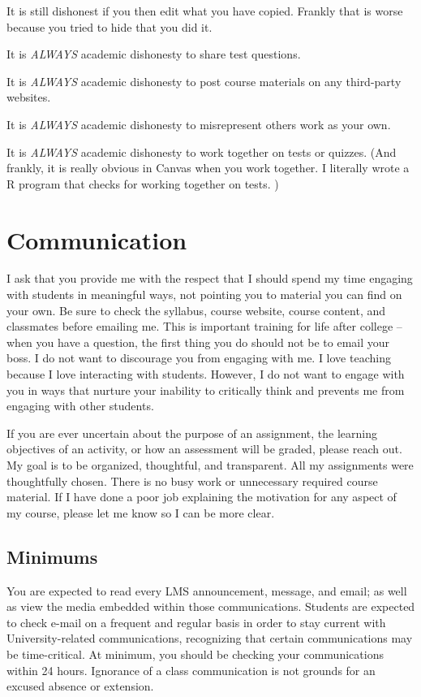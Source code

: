 \documentclass[
]{book}
\begin{document}
It is still dishonest if you then edit what you have copied. Frankly that is worse because you tried to hide that you did it.

It is \emph{ALWAYS} academic dishonesty to share test questions.

It is \emph{ALWAYS} academic dishonesty to post course materials on any third-party websites.

It is \emph{ALWAYS} academic dishonesty to misrepresent others work as your own.

It is \emph{ALWAYS} academic dishonesty to work together on tests or quizzes.
(And frankly, it is really obvious in Canvas when you work together.
I literally wrote a R program that checks for working together on tests. )

\hypertarget{communication}{%
\chapter{Communication}\label{communication}}

I ask that you provide me with the respect that I should spend my time engaging with students in meaningful ways, not pointing you to material you can find on your own. Be sure to check the syllabus, course website, course content, and classmates before emailing me. This is important training for life after college -- when you have a question, the first thing you do should not be to email your boss. I do not want to discourage you from engaging with me. I love teaching because I love interacting with students. However, I do not want to engage with you in ways that nurture your inability to critically think and prevents me from engaging with other students.

If you are ever uncertain about the purpose of an assignment, the learning objectives of an activity, or how an assessment will be graded, please reach out. My goal is to be organized, thoughtful, and transparent. All my assignments were thoughtfully chosen. There is no busy work or unnecessary required course material. If I have done a poor job explaining the motivation for any aspect of my course, please let me know so I can be more clear.

\hypertarget{minimums}{%
\section{Minimums}\label{minimums}}

You are expected to read every LMS announcement, message, and email; as well as view the media embedded within those communications. Students are expected to check e-mail on a frequent and regular basis in order to stay current with University-related communications, recognizing that certain communications may be time-critical. At minimum, you should be checking your communications within 24 hours. Ignorance of a class communication is not grounds for an excused absence or extension.
\end{document}
